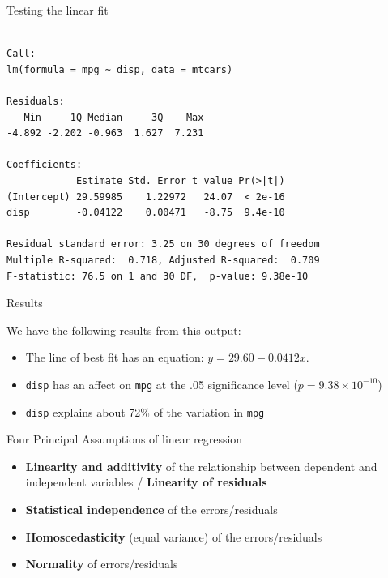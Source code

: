 \begin{frame}[fragile]{Testing the linear fit}

\begin{Shaded}
\begin{Highlighting}[]
\end{Highlighting}
\end{Shaded}

\begin{verbatim}

Call:
lm(formula = mpg ~ disp, data = mtcars)

Residuals:
   Min     1Q Median     3Q    Max 
-4.892 -2.202 -0.963  1.627  7.231 

Coefficients:
            Estimate Std. Error t value Pr(>|t|)
(Intercept) 29.59985    1.22972   24.07  < 2e-16
disp        -0.04122    0.00471   -8.75  9.4e-10

Residual standard error: 3.25 on 30 degrees of freedom
Multiple R-squared:  0.718, Adjusted R-squared:  0.709 
F-statistic: 76.5 on 1 and 30 DF,  p-value: 9.38e-10
\end{verbatim}

\end{frame}

\begin{frame}[fragile]{Results}

We have the following results from this output:

\begin{itemize}
\tightlist
\item
  The line of best fit has an equation: \(y = 29.60 - 0.0412 x\).
\item
  \texttt{disp} has an affect on \texttt{mpg} at the .05 significance
  level (\(p=9.38\times 10^{-10}\))
\item
  \texttt{disp} explains about 72\% of the variation in \texttt{mpg}
\end{itemize}

\end{frame}

\begin{frame}{Four Principal Assumptions of linear regression}

\begin{itemize}
\tightlist
\item
  \textbf{Linearity and additivity} of the relationship between
  dependent and independent variables / \textbf{Linearity of residuals}
\item
  \textbf{Statistical independence} of the errors/residuals
\item
  \textbf{Homoscedasticity} (equal variance) of the errors/residuals
\item
  \textbf{Normality} of errors/residuals
\end{itemize}

\end{frame}

